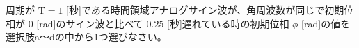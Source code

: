 周期が $\textrm{T}=1$ [秒]である時間領域アナログサイン波が、角周波数が同じで初期位相が $0$ [rad]のサイン波と比べて $0.25$ [秒]遅れている時の初期位相 $\phi$ [rad]の値を選択肢a〜dの中から1つ選びなさい。
